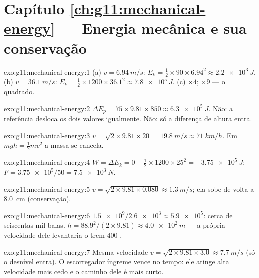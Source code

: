\section*{Capítulo \ref{ch:g11:mechanical-energy} --- Energia mecânica e sua conservação}

\begin{solution}{exo:g11:mechanical-energy:1}
(a) $v = \qty{6.94}{m/s}$:
$E_k = \tfrac12 \times 90 \times 6.94^2 \approx \qty{2.2e3}{J}$.
(b) $v = \qty{36.1}{m/s}$:
$E_k = \tfrac12 \times 1200 \times 36.1^2 \approx \qty{7.8e5}{J}$.
(c) $\times 4$; $\times 9$ --- o quadrado.
\end{solution}

\begin{solution}{exo:g11:mechanical-energy:2}
$\Delta E_p = 75 \times 9.81 \times 850 \approx \qty{6.3e5}{J}$. Não: a
referência desloca os dois valores igualmente. Não: só a diferença de
altura entra.
\end{solution}

\begin{solution}{exo:g11:mechanical-energy:3}
$v = \sqrt{2 \times 9.81 \times 20} = \qty{19.8}{m/s} \approx
\qty{71}{km/h}$. Em $mgh = \tfrac12 mv^2$ a massa se cancela.
\end{solution}

\begin{solution}{exo:g11:mechanical-energy:4}
$W = \Delta E_k = 0 - \tfrac12 \times 1200 \times 25^2 =
\qty{-3.75e5}{J}$; $F = \num{3.75e5}/50 = \qty{7.5e3}{N}$.
\end{solution}

\begin{solution}{exo:g11:mechanical-energy:5}
$v = \sqrt{2 \times 9.81 \times 0.080} \approx \qty{1.3}{m/s}$; ela sobe
de volta a \qty{8.0}{cm} (conservação).
\end{solution}

\begin{solution}{exo:g11:mechanical-energy:6}
$\num{1.5e9}/\num{2.6e3} \approx \num{5.9e5}$: cerca de seiscentas mil
balas. $h = 88.9^2/(2 \times 9.81) \approx \qty{4.0e2}{m}$ --- a própria
velocidade dele levantaria o trem $400$ .
\end{solution}

\begin{solution}{exo:g11:mechanical-energy:7}
Mesma velocidade
$v = \sqrt{2 \times 9.81 \times 3.0} \approx \qty{7.7}{m/s}$ (só o
desnível entra). O escorregador íngreme vence no tempo: ele atinge alta
velocidade mais cedo e o caminho dele é mais curto.
\end{solution}

